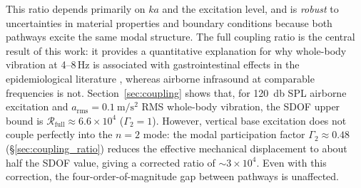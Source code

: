 This ratio depends primarily on $ka$ and the excitation level, and is
\emph{robust} to uncertainties in material properties and boundary conditions
because both pathways excite the same modal structure.  The full coupling ratio
is the central result of this work: it provides a quantitative explanation for why
whole-body vibration at 4--8\,Hz is associated with gastrointestinal effects in
the epidemiological literature \cite{Griffin1990}, whereas airborne
infrasound at comparable frequencies is not.  Section~\ref{sec:coupling}
shows that, for \SI{120}{\decibel} SPL airborne excitation and
$a_\mathrm{rms} = \SI{0.1}{\metre\per\second\squared}$ RMS whole-body
vibration, the SDOF upper bound is $\mathcal{R}_\mathrm{full} \approx 6.6 \times 10^4$
($\Gamma_2 = 1$).  However, vertical base excitation does not couple
perfectly into the $n = 2$ mode: the modal participation factor
$\Gamma_2 \approx 0.48$ (\S\ref{sec:coupling_ratio}) reduces the effective
mechanical displacement to about half the SDOF value, giving a corrected
ratio of $\sim 3 \times 10^4$.  Even with this correction, the four-order-of-magnitude
gap between pathways is unaffected.
